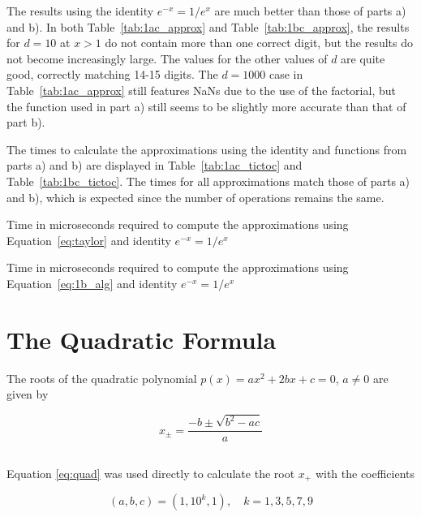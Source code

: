 \documentclass[11pt]{article} %
\begin{document}
The results using the  identity $e^{-x} = 1/e^x$ are much better than those of parts a) and b). In both Table~\ref{tab:1ac_approx} and Table~\ref{tab:1bc_approx}, the results for $d=10$ at $x>1$ do not contain more than one correct digit, but the results do not become increasingly large. The values for the other values of $d$ are quite good, correctly matching 14-15 digits. The $d=1000$ case in Table~\ref{tab:1ac_approx} still features NaNs due to the use of the factorial, but the function used in part a) still seems to be slightly more accurate than that of part b).

The times to calculate the approximations using the identity and functions from parts a) and b) are displayed in Table~\ref{tab:1ac_tictoc} and Table~\ref{tab:1bc_tictoc}. The times for all approximations match those of parts a) and b), which is expected since the number of operations remains the same.


\begin{table}[h!]
\centering

\caption{Time in microseconds required to compute the approximations using Equation~\ref{eq:taylor} and identity $e^{-x} = 1/e^x$}
\label{tab:1ac_tictoc}
\end{table}

\begin{table}[h!]
\centering

\caption{Time in microseconds required to compute the approximations using Equation~\ref{eq:1b_alg} and identity $e^{-x} = 1/e^x$}
\label{tab:1bc_tictoc}
\end{table}

\clearpage

\section{The Quadratic Formula}
The roots of the quadratic polynomial $p(x) = ax^2 + 2bx + c = 0$,  $a \neq 0 $ are given by

\begin{equation}
x_{\pm} = \frac{-b \pm \sqrt{b^2 -ac}}{a}
\label{eq:quad}
\end{equation}

\subsection{} %
Equation \ref{eq:quad} was used directly to calculate the root $x_+$ with the coefficients

\begin{equation}
(a,b,c)=(1,10^k, 1), \quad k=1,3,5,7,9
\end{equation}
\end{document}
